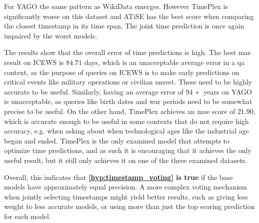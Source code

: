 For YAGO the same pattern as WikiData emerges. However TimePlex is significantly worse on this dataset and ATiSE has the best score when comparing the closest timestamp in its time span. The joint time prediction is once again impaired by the worst models. 

The results show that the overall error of time predictions is high. The best \gls{mae} result on \mbox{ICEWS} is $84.71$ days, which is an unacceptable average error in a \gls{qa} context, as the purpose of queries on ICEWS is to make early predictions on critical events like military operations or civilian unrest. These need to be highly accurate to be useful. Similarly, having an average error of $94+$ years on YAGO is unacceptable, as queries like birth dates and war periods need to be somewhat precise to be useful. On the other hand, TimePlex achieves an \gls{mae} score of $21.90$, which is accurate enough to be useful in some contexts that do not require high accuracy, e.g. when asking about when technological ages like the industrial age began and ended. TimePlex is the only examined model that attempts to optimize time predictions, and as such it is encouraging that it achieves the only useful result, but it still only achieves it on one of the three examined datasets.

Overall, this indicates that \textbf{\autoref{hyp:timestamp_voting} is true} if the base models have approximately equal precision.
A more complex voting mechanism when jointly selecting timestamps might yield better results, such as giving less weight to less accurate models, or using more than just the top scoring prediction for each model.